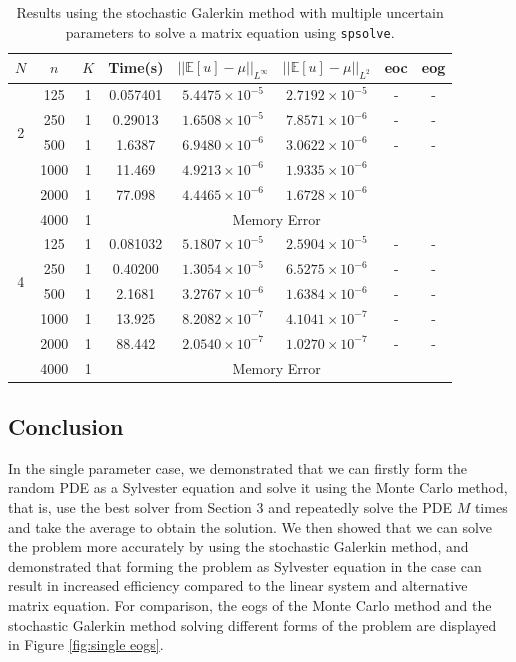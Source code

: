 \documentclass[11pt]{article}
\numberwithin{equation}{section}
\begin{document}
\begin{table}[H]
\centering
\begin{tabular}{|c|c|c|c|c|c|c|c|}
\hline
$N$ & $n$ & $K$ & Time(s) & $|| \mathbb{E}[u] - \mu ||_{L^{\infty}}$ & $|| \mathbb{E}[u] - \mu ||_{L^{2}}$ & eoc & eog \\
\hline
\multirow{4}{*}{2} & 125 & 1 & 0.057401 & $5.4475 \times 10^{-5}$ & $2.7192 \times 10^{-5}$ & - & - \\
& 250 & 1 & 0.29013 & $1.6508 \times 10^{-5}$ & $7.8571 \times 10^{-6}$ & - & - \\
& 500 & 1 & 1.6387 & $6.9480 \times 10^{-6}$ & $3.0622 \times 10^{-6}$  & - & - \\
& 1000 & 1 & 11.469 & $4.9213 \times 10^{-6}$ & $1.9335 \times 10^{-6}$ & & \\
& 2000 & 1 & 77.098 & $4.4465 \times 10^{-6}$ & $1.6728 \times 10^{-6}$ & & \\
\cline{4-8}
& 4000 & 1 & \multicolumn{5}{c|}{Memory Error} \\
\hline
\multirow{4}{*}{4} & 125 & 1 & 0.081032 & $5.1807 \times 10^{-5}$ & $2.5904 \times 10^{-5}$ & - & - \\
& 250 & 1 & 0.40200 & $1.3054 \times 10^{-5}$ & $6.5275 \times 10^{-6}$ & - & - \\
& 500 & 1 & 2.1681 & $3.2767 \times 10^{-6}$ & $1.6384 \times 10^{-6}$ & - & - \\
& 1000 & 1 & 13.925 & $8.2082 \times 10^{-7}$ & $4.1041 \times 10^{-7}$ & - & - \\
& 2000 & 1 & 88.442 & $2.0540 \times 10^{-7}$ & $1.0270 \times 10^{-7}$ & - & - \\
\cline{4-8}
& 4000 & 1 & \multicolumn{5}{c|}{Memory Error} \\
\hline
\end{tabular}
\captionsetup{justification=centering}
\caption{Results using the stochastic Galerkin method with multiple uncertain parameters to solve a matrix equation using \texttt{spsolve}.}
\label{table:galerkin multiple matrix}
\end{table}

\newpage

\subsection{Conclusion}

In the single parameter case, we demonstrated that we can firstly form the random PDE as a Sylvester equation and solve it using the Monte Carlo method, that is, use the best solver from Section 3 and repeatedly solve the PDE $M$ times and take the average to obtain the solution. We then showed that we can solve the problem more accurately by using the stochastic Galerkin method, and demonstrated that forming the problem as Sylvester equation in the case can result in increased efficiency compared to  the linear system and alternative matrix equation. For comparison, the eogs of the Monte Carlo method and the stochastic Galerkin method solving different forms of the problem are displayed in Figure \ref{fig:single eogs}.
\end{document}
